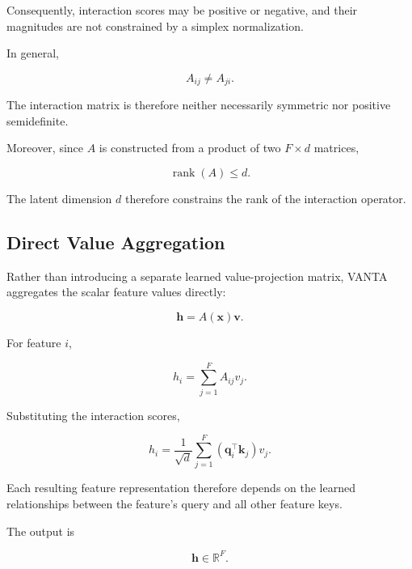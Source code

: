 \documentclass[11pt,a4paper]{article}
\newcommand{\R}{\mathbb{R}}
\begin{document}
Consequently, interaction scores may be
positive or negative, and their magnitudes
are not constrained by a simplex normalization.

In general,

\begin{equation}
A_{ij}\neq A_{ji}.
\end{equation}

The interaction matrix is therefore neither
necessarily symmetric nor positive semidefinite.

Moreover, since $A$ is constructed from
a product of two $F\times d$ matrices,

\begin{equation}
\boxed{
\operatorname{rank}(A)\leq d.
}
\label{eq:rank}
\end{equation}

The latent dimension $d$ therefore
constrains the rank of the interaction
operator.

\subsection{Direct Value Aggregation}

Rather than introducing a separate learned
value-projection matrix, VANTA aggregates
the scalar feature values directly:

\begin{equation}
\boxed{
\mathbf{h}
=
A(\mathbf{x})\mathbf{v}.
}
\label{eq:aggregation}
\end{equation}

For feature $i$,

\begin{equation}
h_i
=
\sum_{j=1}^{F}A_{ij}v_j.
\end{equation}

Substituting the interaction scores,

\begin{equation}
h_i
=
\frac{1}{\sqrt d}
\sum_{j=1}^{F}
(\mathbf{q}_i^\top\mathbf{k}_j)v_j.
\end{equation}

Each resulting feature representation
therefore depends on the learned
relationships between the feature's
query and all other feature keys.

The output is

\begin{equation}
\mathbf{h}\in\R^F.
\end{equation}

\end{document}
